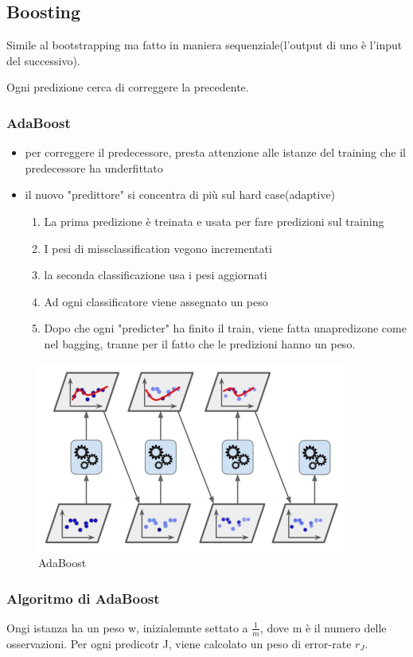 \subsection{Boosting}
Simile al bootstrapping ma fatto in maniera sequenziale(l'output di uno è l'input del successivo).

Ogni predizione cerca di correggere la precedente.

\subsubsection{AdaBoost}
\begin{itemize}
    \item per correggere il predecessore, presta attenzione alle istanze del training
    che il predecessore ha underfittato
    \item il nuovo "predittore" si concentra di più sul hard case(adaptive)
    \begin{enumerate}
        \item La prima predizione è treinata e usata per fare predizioni sul training
        \item I pesi di missclassification vegono incrementati
        \item la seconda classificazione usa i pesi aggiornati
        \item Ad ogni classificatore viene assegnato un peso
        \item Dopo che ogni "predicter" ha finito il train, viene fatta unapredizone come nel
        bagging, tranne per il fatto che le predizioni hanno un peso.
    \end{enumerate}
\end{itemize}

\begin{figure}[H]
    \centering
    \includegraphics[width=0.3\linewidth]{imgs/ada-boosting}
    \caption{AdaBoost}
    \label{fig:AdaBoost}
\end{figure}

\subsubsection{Algoritmo di AdaBoost}
Ongi istanza ha un peso w,
inizialemnte settato a $\frac{1}{m}$,
dove m è il numero delle osservazioni.
Per ogni predicotr J, viene calcolato un peso di error-rate $r_J$.

